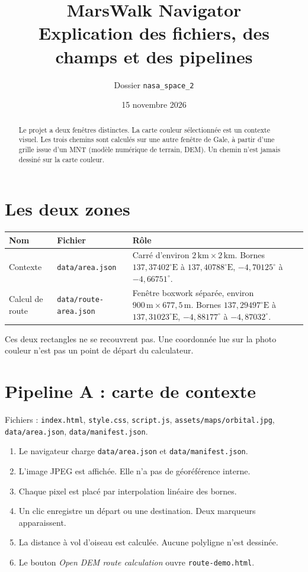 \documentclass[11pt,a4paper]{article}
\title{MarsWalk Navigator\\
\large Explication des fichiers, des champs et des pipelines}
\author{Dossier \texttt{nasa\_space\_2}}
\date{15 novembre 2026}
\begin{document}
\maketitle

\begin{abstract}
Le projet a deux fenêtres distinctes. La carte couleur sélectionnée est un contexte visuel.
Les trois chemins sont calculés sur une autre fenêtre de Gale, à partir d'une grille issue d'un MNT
(modèle numérique de terrain, DEM). Un chemin n'est jamais dessiné sur la carte couleur.
\end{abstract}

\section{Les deux zones}

\begin{center}
\begin{tabular}{@{}llp{6.2cm}@{}}
\toprule
Nom & Fichier & Rôle \\
\midrule
Contexte & \texttt{data/area.json} &
Carré d'environ \(2\,\mathrm{km}\times 2\,\mathrm{km}\).
Bornes \(137{,}37402^\circ\mathrm{E}\) à \(137{,}40788^\circ\mathrm{E}\),
\(-4{,}70125^\circ\) à \(-4{,}66751^\circ\). \\
Calcul de route & \texttt{data/route-area.json} &
Fenêtre boxwork séparée, environ \(900\,\mathrm{m}\times 677{,}5\,\mathrm{m}\).
Bornes \(137{,}29497^\circ\mathrm{E}\) à \(137{,}31023^\circ\mathrm{E}\),
\(-4{,}88177^\circ\) à \(-4{,}87032^\circ\). \\
\bottomrule
\end{tabular}
\end{center}

Ces deux rectangles ne se recouvrent pas. Une coordonnée lue sur la photo couleur
n'est pas un point de départ du calculateur.

\section{Pipeline A : carte de contexte}

Fichiers : \texttt{index.html}, \texttt{style.css}, \texttt{script.js},
\texttt{assets/maps/orbital.jpg}, \texttt{data/area.json}, \texttt{data/manifest.json}.

\begin{enumerate}
  \item Le navigateur charge \texttt{data/area.json} et \texttt{data/manifest.json}.
  \item L'image JPEG est affichée. Elle n'a pas de géoréférence interne.
  \item Chaque pixel est placé par interpolation linéaire des bornes.
  \item Un clic enregistre un départ ou une destination. Deux marqueurs apparaissent.
  \item La distance à vol d'oiseau est calculée. Aucune polyligne n'est dessinée.
  \item Le bouton \emph{Open DEM route calculation} ouvre \texttt{route-demo.html}.
\end{enumerate}
\end{document}
